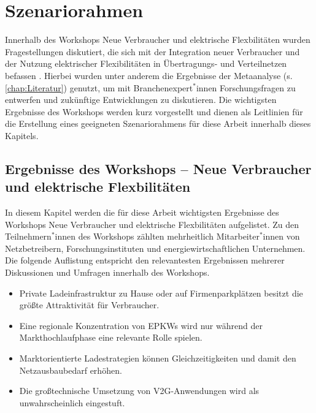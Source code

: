 
\section{Szenariorahmen}\label{chap:Szenariorahmen}

Innerhalb des Workshops \glqq Neue Verbraucher und elektrische Flexbilitäten\grqq{} wurden Fragestellungen diskutiert, die sich mit der Integration neuer Verbraucher und der Nutzung elektrischer Flexibilitäten in Übertragungs- und Verteilnetzen befassen \cite{RLI2020}.
Hierbei wurden unter anderem die Ergebnisse der Metaanalyse (s. \autoref{chap:Literatur}) genutzt, um mit Branchenexpert$^*$innen Forschungsfragen zu entwerfen und zukünftige Entwicklungen zu diskutieren.
Die wichtigsten Ergebnisse des Workshops werden kurz vorgestellt und dienen als Leitlinien für die Erstellung eines geeigneten Szenariorahmens für diese Arbeit innerhalb dieses Kapitels.


\subsection{Ergebnisse des Workshops {--} Neue Verbraucher und elektrische Flexbilitäten}

In diesem Kapitel werden die für diese Arbeit wichtigsten Ergebnisse des Workshops \glqq Neue Verbraucher und elektrische Flexbilitäten\grqq{} aufgelistet.
Zu den Teilnehmern$^*$innen des Workshops zählten mehrheitlich Mitarbeiter$^*$innen von Netzbetreibern, Forschungsinstituten und energiewirtschaftlichen Unternehmen.
Die folgende Auflistung entspricht den relevantesten Ergebnissen mehrerer Diskussionen und Umfragen innerhalb des Workshops.

\begin{itemize}
	\item Private Ladeinfrastruktur zu Hause oder auf Firmenparkplätzen besitzt die größte Attraktivität für Verbraucher.
	\item Eine regionale Konzentration von \glspl{EPKW} wird nur während der Markthochlaufphase eine relevante Rolle spielen.
	\item Marktorientierte Ladestrategien können Gleichzeitigkeiten und damit den Netzausbaubedarf erhöhen.
	\item Die großtechnische Umsetzung von \gls{V2G}-Anwendungen wird als unwahrscheinlich eingestuft.
	
\end{itemize}


